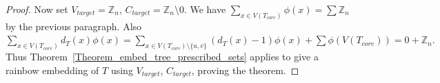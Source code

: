 \documentclass[a4paper,11pt,hidelinks]{amsart}
\theoremstyle{definition}
\newcommand{\AM}[1]{\textcolor{blue}{[#1]}}
\begin{document}
\begin{proof}
Now set $V_{target}= \mathbb{Z}_n$, $C_{target}= \mathbb{Z}_n\setminus 0$. 
We have $\sum_{x\in V(T_{core})}\phi(x)= \sum\mathbb{Z}_n$ by the previous paragraph. 
Also $\sum_{x\in V(T_{core})}d_T(x)\phi(x)=\sum_{x\in V(T_{core})\setminus \{u,v\}}(d_T(x)-1)\phi(x) +\sum\phi(V(T_{core}))=0+\mathbb{Z}_n.$ Thus Theorem~\ref{Theorem_embed_tree_prescribed_sets} applies to give a rainbow embedding of $T$ using $V_{target}$, $C_{target}$, proving the theorem.
\end{proof}




\end{document}
